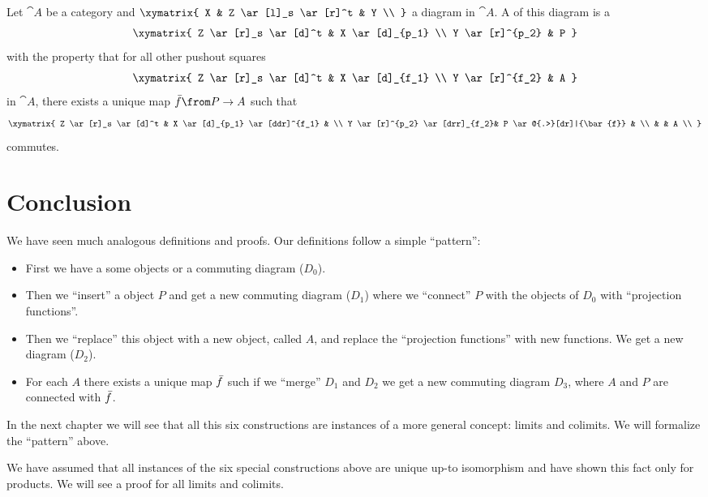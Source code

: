 \begin{definition}[Pushout]
  \label{def:pushout}
  Let $\cat{A}$ be a category and
  $ \xymatrix{
    X & Z \ar[l]_s \ar[r]^t & Y \\
  } $
  a diagram in $\cat{A}$.
  A  of this diagram is a  \\
  \[ \xymatrix{
    Z \ar[r]_s \ar[d]^t & X \ar[d]_{p_1} \\
    Y \ar[r]^{p_2} & P
  } \]
  with the property that for all other pushout squares
  \[ \xymatrix{
    Z \ar[r]_s \ar[d]^t & X \ar[d]_{f_1} \\
    Y \ar[r]^{f_2} & A
  } \]
  in $\cat{A}$, there exists a unique map $\bar{f}\from P \to A$ such that
  \[ \xymatrix{
    Z \ar[r]_s \ar[d]^t & X \ar[d]_{p_1} \ar[ddr]^{f_1} & \\
    Y \ar[r]^{p_2} \ar[drr]_{f_2}& P \ar@{.>}[dr]|{\bar{f}} & \\
    & & A  \\
  } \]
  commutes.
\end{definition}


\section*{Conclusion}
We have seen much analogous definitions and proofs.
Our definitions follow a simple ``pattern'':
\begin{itemize}
  \item First we have a some objects or a commuting diagram ($D_0$).
  \item Then we ``insert'' a object $P$ and get a new commuting diagram ($D_1$) where we ``connect'' $P$ with the objects of $D_0$ with ``projection functions''.
  \item Then we ``replace'' this object with a new object, called $A$, and replace the ``projection functions'' with new functions. We get a new diagram ($D_2$).
  \item For each $A$ there exists a unique map $\bar{f}$ such if we ``merge'' $D_1$ and $D_2$ we get a new commuting diagram $D_3$, where $A$ and $P$ are connected with $\bar{f}$.
\end{itemize}

In the next chapter we will see that all this six constructions are instances of a more general concept: limits and colimits.
We will formalize the ``pattern'' above.

We have assumed that all instances of the six special constructions above are unique up-to isomorphism
and have shown this fact only for products. We will see a proof for all limits and colimits.



